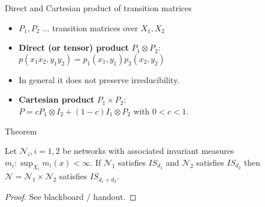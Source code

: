 \documentclass{beamer}\usepackage[]{graphicx}\usepackage[]{color}
\begin{document}
\begin{frame}[fragile]{Direct and Cartesian product of transition matrices}
\begin{itemize}
\item $P_1, P_2$ ... transition matrices over $X_1, X_2$
\item \textbf{Direct (or tensor) product} $P_1 \otimes P_2$:\\
$p(x_1 x_2, y_1 y_2) =  p_1(x_1, y_1)p_2(x_2, y_2)$
\item In general it does not preserve irreducibility.
\item \textbf{Cartesian product} $P_1 \times P_2$:\\
$P = c P_1 \otimes I_2 + (1 - c) I_1 \otimes P_2$ with $0<c<1$.
\end{itemize}
\end{frame}

\begin{frame}[fragile]{Theorem}
\begin{theorem}
Let $\mathcal{N}_i,i=1,2$ be networks with associated invariant measures $m_i: \sup_{X_i} m_i(x)<\infty$. If $\mathcal{N}_1$ satisfies $IS_{d_1}$ and $\mathcal{N}_2$ satisfies $IS_{d_2}$ then $\mathcal{N} = \mathcal{N}_1 \times \mathcal{N}_2$ satisfies $IS_{d_1+d_2}$.
\end{theorem}
\vspace{5mm}
\begin{proof}
See blackboard / handout.
\end{proof}
\end{frame}

\end{document}
